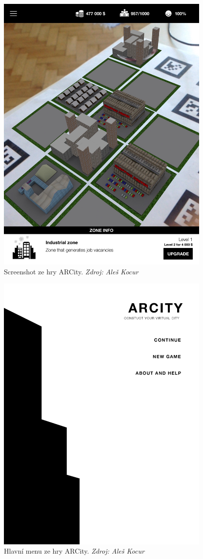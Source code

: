 \documentclass[twoside,12pt]{article}
\begin{document}
\newpage


\begin{figure}[H]
\centering
    \includegraphics[width=400px, center]{images/screenshot1.jpg}
\captionsetup{justification=centering}
    \caption{Screenshot ze hry ARCity. \textit{Zdroj: Aleš Kocur}}
    \label{screenshot3}
\end{figure}

\begin{figure}[H]
\centering
    \includegraphics[width=400px, center]{images/screenshot2.png}
\captionsetup{justification=centering}
    \caption{Hlavní menu ze hry ARCity. \textit{Zdroj: Aleš Kocur}}
    \label{screenshot3}
\end{figure}
\end{document}
